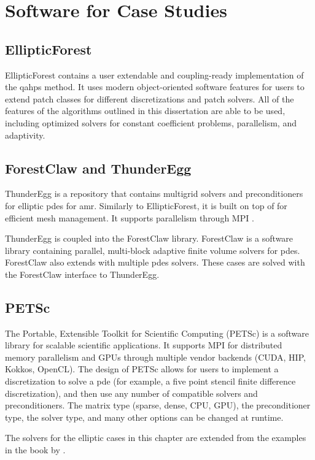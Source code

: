 \section{Software for Case Studies}

\subsection{EllipticForest}
\label{sub:elliptic-forest}

EllipticForest contains a user extendable and coupling-ready implementation of the \gls{qahps} method. It uses modern object-oriented software features for users to extend patch classes for different discretizations and patch solvers. All of the features of the algorithms outlined in this dissertation are able to be used, including optimized solvers for constant coefficient problems, parallelism, and adaptivity.

\subsection{ForestClaw and ThunderEgg}
\label{sub:thunder-egg}

ThunderEgg \citep{aiton2022thunderegg} is a repository that contains multigrid solvers and preconditioners for elliptic \gls{pdes} for \gls{amr}. Similarly to EllipticForest, it is built on top of \pforest \citep{burstedde2011p4est,burstedde2020parallel} for efficient mesh management. It supports parallelism through MPI \citep{mpi40}.

ThunderEgg is coupled into the ForestClaw library. ForestClaw \citep{calhoun2017forestclaw} is a software library containing parallel, multi-block adaptive finite volume solvers for \gls{pdes}. ForestClaw also extends \pforest \citep{burstedde2011p4est,burstedde2020parallel} with multiple \gls{pdes} solvers. These cases are solved with the ForestClaw interface to ThunderEgg.

\subsection{PETSc}
\label{sub:petsc}

The Portable, Extensible Toolkit for Scientific Computing (PETSc) is a software library for scalable scientific applications. It supports MPI \citep{mpi40} for distributed memory parallelism and GPUs through multiple vendor backends (CUDA, HIP, Kokkos, OpenCL). The design of PETSc allows for users to implement a discretization to solve a \gls{pde} (for example, a five point stencil finite difference discretization), and then use any number of compatible solvers and preconditioners. The matrix type (sparse, dense, CPU, GPU), the preconditioner type, the solver type, and many other options can be changed at runtime.

The solvers for the elliptic cases in this chapter are extended from the examples in the book by \cite{bueler2020petsc}.